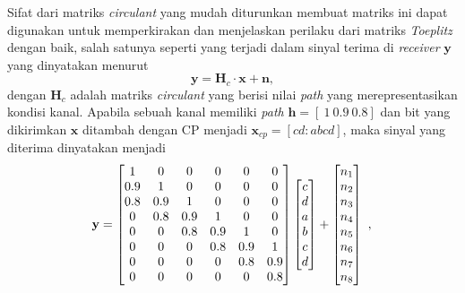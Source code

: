 Sifat dari matriks \textit{circulant} yang mudah diturunkan membuat matriks ini dapat digunakan untuk memperkirakan dan menjelaskan perilaku dari matriks \textit{Toeplitz} dengan baik, salah satunya seperti yang terjadi dalam sinyal terima di \textit{receiver} $\mathbf{y}$ yang dinyatakan menurut 
\begin{equation}
\mathbf{y}= \mathbf{H}_c \cdot \mathbf{x}+ \mathbf{n},
\label{matrixeq}
\end{equation} 
dengan $\mathbf{H}_c$ adalah matriks \textit{circulant} yang berisi nilai \textit{path} yang merepresentasikan kondisi kanal. Apabila sebuah kanal memiliki \textit{path} $\mathbf{h}=[~1 ~0.9 ~0.8]$ dan bit yang dikirimkan $\mathbf{x}$ ditambah dengan CP menjadi $\mathbf{x}_{cp}=[c d: a b c d]$, maka sinyal yang diterima dinyatakan menjadi
\begin{equation}
\textbf{y} = \begin{bmatrix}
1   & 0   & 0   & 0   & 0   & 0\\ 
0.9 & 1   & 0   & 0   & 0   & 0\\ 
0.8 & 0.9 & 1   & 0   & 0   & 0\\ 
0   & 0.8 & 0.9 & 1   & 0   & 0\\ 
0   & 0   & 0.8 & 0.9 & 1   & 0\\ 
0   & 0   & 0   & 0.8 & 0.9 & 1\\ 
0   & 0   & 0   &  0  & 0.8 & 0.9\\ 
0   & 0   & 0   &  0  & 0   & 0.8
\end{bmatrix}
\begin{bmatrix}
c\\ 
d\\ 
a\\ 
b\\ 
c\\ 
d
\end{bmatrix}
+ \begin{bmatrix}
n_{1}\\ 
n_{2}\\ 
n_{3}\\ 
n_{4}\\ 
n_{5}\\ 
n_{6}\\ 
n_{7}\\ 
n_{8}
\end{bmatrix}~,\\
\end{equation}







